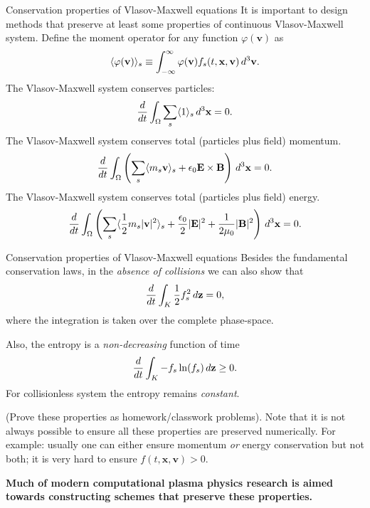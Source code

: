 \documentclass[pdf]{beamer}
\newcommand{\mvec}[1]{\mathbf{#1}}
\newcommand{\dtv}{\thinspace d^3\mvec{v}}
\newcommand{\dtx}{\thinspace d^3\mvec{x}}
\theoremstyle{definition}
\begin{document}
\begin{frame}{Conservation properties of Vlasov-Maxwell equations}
  \small%
  It is important to design methods that preserve at least some
  properties of continuous Vlasov-Maxwell system. Define the moment
  operator for any function $\varphi(\mvec{v})$ as
  \begin{align*}
    \langle \varphi(\mvec{v}) \rangle_s
    \equiv
    \int_{-\infty}^{\infty} \varphi(\mvec{v}) f_s(t,\mvec{x},\mvec{v}) \dtv.
    \label{eq:momentDefinition}
  \end{align*}
  The Vlasov-Maxwell system conserves particles:
  \begin{align*}
    \frac{d}{dt}\int_\Omega \sum_s \langle 1 \rangle_s \dtx = 0.
  \end{align*}
  The Vlasov-Maxwell system conserves total (particles plus field)
  momentum.
  \begin{align*}
    \frac{d}{dt} \int_\Omega \left( \sum_s \langle m_s\mvec{v} \rangle_s + \epsilon_0 \mvec{E}\times\mvec{B} \right) \dtx = 0.
  \end{align*}
  The Vlasov-Maxwell system conserves total (particles plus field) energy.
  \begin{align*}
    \frac{d}{dt} \int_\Omega \left(\sum_s \langle \frac{1}{2} m_s |\mvec{v}|^2 \rangle_s + \frac{\epsilon_0}{2} |\mvec{E}|^2 + \frac{1}{2\mu_0} |\mvec{B}|^2 \right) \dtx = 0.
  \end{align*}
\end{frame}

\begin{frame}{Conservation properties of Vlasov-Maxwell equations}
  \small
  Besides the fundamental conservation laws, in the \emph{absence of
    collisions} we can also show that
  \begin{align*}
    \frac{d}{dt}\int_K \frac{1}{2} f_s^2\thinspace d\mvec{z} = 0,
  \end{align*}
  where the integration is taken over the complete phase-space.

  Also, the entropy is a \emph{non-decreasing} function of time
  \begin{align*}
    \frac{d}{dt}\int_K -f_s \ln(f_s) \thinspace d\mvec{z} \ge 0.
  \end{align*}
  For collisionless system the entropy remains \emph{constant}.

  (Prove these properties as homework/classwork problems). Note that
  it is not always possible to ensure all these properties are
  preserved numerically. For example: usually one can either ensure
  momentum \emph{or} energy conservation but not both; it is very hard
  to ensure $f(t,\mvec{x},\mvec{v})>0$.

  {\bf Much of modern computational plasma physics research is aimed
    towards constructing schemes that preserve these properties.}
\end{frame}  
\end{document}
